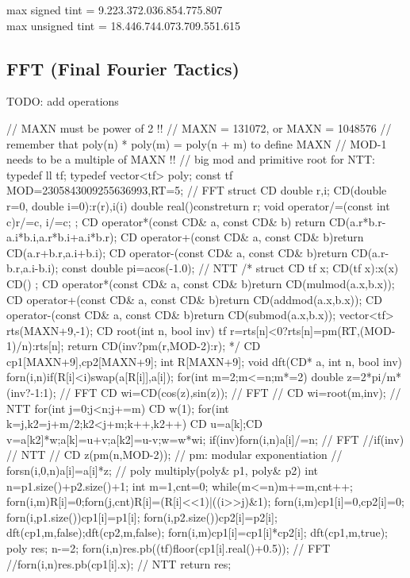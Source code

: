 \documentclass[10pt, landscape, twocolumn, a4paper, notitlepage]{article}
\begin{document}
max signed tint = 9.223.372.036.854.775.807 \\
max unsigned tint = 18.446.744.073.709.551.615
\subsection{FFT (Final Fourier Tactics)}
TODO: add operations
\begin{code}
// MAXN must be power of 2 !!
// MAXN = 131072, or MAXN = 1048576 
// remember that poly(n) * poly(m) = poly(n + m) to define MAXN
// MOD-1 needs to be a multiple of MAXN !!
// big mod and primitive root for NTT:
typedef ll tf;
typedef vector<tf> poly;
const tf MOD=2305843009255636993,RT=5;
// FFT
struct CD {
	double r,i;
	CD(double r=0, double i=0):r(r),i(i){}
	double real()const{return r;}
	void operator/=(const int c){r/=c, i/=c;}
};
CD operator*(const CD& a, const CD& b){
	return CD(a.r*b.r-a.i*b.i,a.r*b.i+a.i*b.r);}
CD operator+(const CD& a, const CD& b){return CD(a.r+b.r,a.i+b.i);}
CD operator-(const CD& a, const CD& b){return CD(a.r-b.r,a.i-b.i);}
const double pi=acos(-1.0);
// NTT
/*
struct CD {
	tf x;
	CD(tf x):x(x){}
	CD(){}
};
CD operator*(const CD& a, const CD& b){return CD(mulmod(a.x,b.x));}
CD operator+(const CD& a, const CD& b){return CD(addmod(a.x,b.x));}
CD operator-(const CD& a, const CD& b){return CD(submod(a.x,b.x));}
vector<tf> rts(MAXN+9,-1);
CD root(int n, bool inv){
	tf r=rts[n]<0?rts[n]=pm(RT,(MOD-1)/n):rts[n];
	return CD(inv?pm(r,MOD-2):r);
}
*/
CD cp1[MAXN+9],cp2[MAXN+9];
int R[MAXN+9];
void dft(CD* a, int n, bool inv){
	forn(i,n)if(R[i]<i)swap(a[R[i]],a[i]);
	for(int m=2;m<=n;m*=2){
		double z=2*pi/m*(inv?-1:1); // FFT
		CD wi=CD(cos(z),sin(z)); // FFT
		// CD wi=root(m,inv); // NTT
		for(int j=0;j<n;j+=m){
			CD w(1);
			for(int k=j,k2=j+m/2;k2<j+m;k++,k2++){
				CD u=a[k];CD v=a[k2]*w;a[k]=u+v;a[k2]=u-v;w=w*wi;
			}
		}
	}
	if(inv)forn(i,n)a[i]/=n; // FFT
	//if(inv){ // NTT
	//	CD z(pm(n,MOD-2)); // pm: modular exponentiation
	//	forsn(i,0,n)a[i]=a[i]*z;
	//}
}
poly multiply(poly& p1, poly& p2){
	int n=p1.size()+p2.size()+1;
	int m=1,cnt=0;
	while(m<=n)m+=m,cnt++;
	forn(i,m){R[i]=0;forn(j,cnt)R[i]=(R[i]<<1)|((i>>j)&1);}
	forn(i,m)cp1[i]=0,cp2[i]=0;
	forn(i,p1.size())cp1[i]=p1[i];
	forn(i,p2.size())cp2[i]=p2[i];
	dft(cp1,m,false);dft(cp2,m,false);
	forn(i,m)cp1[i]=cp1[i]*cp2[i];
	dft(cp1,m,true);
	poly res;
	n-=2;
	forn(i,n)res.pb((tf)floor(cp1[i].real()+0.5)); // FFT
	//forn(i,n)res.pb(cp1[i].x); // NTT
	return res;
}
\end{code}
\end{document}
